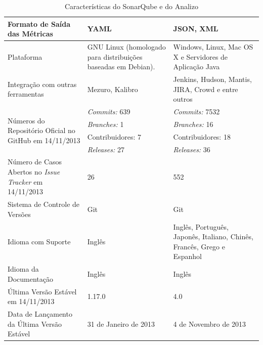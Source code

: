 \begin{savenotes}
\begin{table}[!ht]
\begin{tabular}{|p{5cm}|p{4.5cm}|p{5cm}|}
Formato de Saída das Métricas  & YAML & JSON, XML \\ \hline

Plataforma  &   GNU Linux (homologado para distribuições baseadas em Debian). & Windows, Linux, Mac OS X e Servidores de Aplicação Java                                                                                              \\ \hline

Integração com outras ferramentas & Mezuro, Kalibro & Jenkins, Hudson, Mantis, JIRA, Crowd e entre outros \\ \hline

\multirow{4}{5cm}{Números do Repositório Oficial no GitHub em 14/11/2013}
& \textit{Commits:} 639  & \textit{Commits:} 7532\\ \cline{2-3} 

&\textit{Branches:} 1 & \textit{Branches:} 16  \\ \cline{2-3} 
& Contribuidores: 7 & Contribuidores: 18 \\ \cline{2-3} 
& \textit{Releases:} 27  & \textit{Releases:} 36

 \\ \hline

Número de Casos Abertos no \textit{Issue Tracker} em 14/11/2013 & 26  & 552  
\\ \hline

Sistema de Controle de Versões & Git & Git \\ \hline

Idioma com Suporte & Inglês & Inglês, Português, Japonês, Italiano, Chinês, Francês, Grego e Espanhol \\ \hline

Idioma da Documentação & Inglês & Inglês

\\ \hline
Última Versão Estável em 14/11/2013 & 1.17.0 & 4.0  

\\ \hline
Data de Lançamento da Última Versão Estável & 31 de Janeiro de 2013 & 4 de Novembro de 2013

\\ \hline
\end{tabular}
\caption{Características do SonarQube e do Analizo}
\label{dados-ferramentas-estatica}
\end{table}
\FloatBarrier
\end{savenotes}

